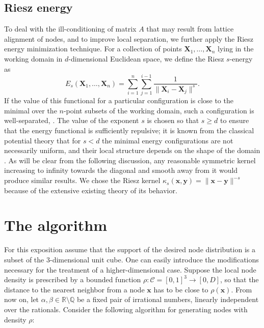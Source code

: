 \documentclass{amsart}
\newcommand{\bs}[1]{\boldsymbol{#1}}
\theoremstyle{definition}
\begin{document}
\subsection{Riesz energy}
To deal with the ill-conditioning of matrix $ A $ that may result from lattice alignment of nodes, and to improve local separation, we further apply the Riesz energy minimization technique. For a collection of points $ \bs{X}_1,\ldots,\bs{X}_n $ lying in the working domain in $ d $-dimensional Euclidean space, we define the Riesz $ s $-energy as 
\[ E_s(\bs{X}_1,\ldots,\bs{X}_n) = \sum_{i=1}^{n}\sum_{j=1}^{i-1} \frac{1}{ \|\bs{X}_i - \bs{X}_j\|^s}. \]
If the value of this functional for a particular configuration is close to the minimal over the $ n $-point subsets of the working domain, such a configuration is well-separated, \cite{Hardin2005}. The value of the exponent $ s $ is chosen so that $ s\geq d $ to ensure that the energy functional is sufficiently repulsive; it is known from the classical potential theory that for $ s<d $ the minimal energy configurations are not necessarily uniform, and their local structure depends on the shape of the domain \cite{Landkof1972}. As will be clear from the following discussion, any reasonable symmetric kernel increasing to infinity towards the diagonal and smooth away from it would produce similar results. We chose the Riesz kernel $ \kappa_s(\bs{x},\bs{y})=\|\bs{x}-\bs{y}\|^{-s} $ because of the extensive existing theory of its behavior.

\section{The algorithm}


For this exposition assume that the support of the desired node distribution is a subset of the $ 3 $-dimensional unit cube. One can easily introduce the modifications necessary for the treatment of a higher-dimensional case. Suppose the local node density is prescribed by a bounded function $\rho:\mathcal{C} =[0,1]^3 \to [0,D]$, so that the distance to the nearest neighbor from a node $ \boldsymbol{x} $ has to be close to $ \rho(\bs{x}) $. From now on, let $ \alpha, \beta\in\mathbb{R}\setminus\mathbb{Q} $ be a fixed pair of irrational numbers, linearly independent over the rationals. Consider the following algorithm for generating nodes with density $ \rho $:  
\end{document}
